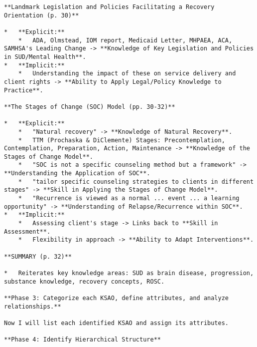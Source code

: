 \documentclass[
  letterpaper,
  DIV=11,
  numbers=noendperiod]{scrartcl}
\begin{document}
\begin{verbatim}
**Landmark Legislation and Policies Facilitating a Recovery Orientation (p. 30)**

*   **Explicit:**
    *   ADA, Olmstead, IOM report, Medicaid Letter, MHPAEA, ACA, SAMHSA's Leading Change -> **Knowledge of Key Legislation and Policies in SUD/Mental Health**.
*   **Implicit:**
    *   Understanding the impact of these on service delivery and client rights -> **Ability to Apply Legal/Policy Knowledge to Practice**.

**The Stages of Change (SOC) Model (pp. 30-32)**

*   **Explicit:**
    *   "Natural recovery" -> **Knowledge of Natural Recovery**.
    *   TTM (Prochaska & DiClemente) Stages: Precontemplation, Contemplation, Preparation, Action, Maintenance -> **Knowledge of the Stages of Change Model**.
    *   "SOC is not a specific counseling method but a framework" -> **Understanding the Application of SOC**.
    *   "tailor specific counseling strategies to clients in different stages" -> **Skill in Applying the Stages of Change Model**.
    *   "Recurrence is viewed as a normal ... event ... a learning opportunity" -> **Understanding of Relapse/Recurrence within SOC**.
*   **Implicit:**
    *   Assessing client's stage -> Links back to **Skill in Assessment**.
    *   Flexibility in approach -> **Ability to Adapt Interventions**.

**SUMMARY (p. 32)**

*   Reiterates key knowledge areas: SUD as brain disease, progression, substance knowledge, recovery concepts, ROSC.

**Phase 3: Categorize each KSAO, define attributes, and analyze relationships.**

Now I will list each identified KSAO and assign its attributes.

**Phase 4: Identify Hierarchical Structure**


\end{verbatim}
\end{document}
